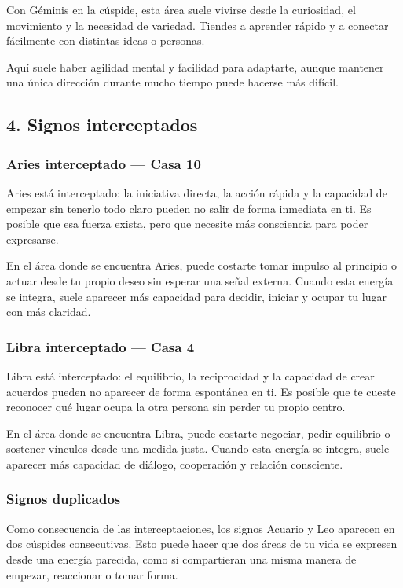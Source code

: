 \documentclass[11pt,a4paper]{article}
\begin{document}
Con Géminis en la cúspide, esta área suele vivirse desde la curiosidad, el movimiento y la necesidad de variedad. Tiendes a aprender rápido y a conectar fácilmente con distintas ideas o personas.

Aquí suele haber agilidad mental y facilidad para adaptarte, aunque mantener una única dirección durante mucho tiempo puede hacerse más difícil.



\vspace{0.5cm}

\subsection{4. Signos interceptados}

\subsubsection*{Aries interceptado — Casa 10}
Aries está interceptado: la iniciativa directa, la acción rápida y la capacidad de empezar sin tenerlo todo claro pueden no salir de forma inmediata en ti. Es posible que esa fuerza exista, pero que necesite más consciencia para poder expresarse.

En el área donde se encuentra Aries, puede costarte tomar impulso al principio o actuar desde tu propio deseo sin esperar una señal externa. Cuando esta energía se integra, suele aparecer más capacidad para decidir, iniciar y ocupar tu lugar con más claridad.

\subsubsection*{Libra interceptado — Casa 4}
Libra está interceptado: el equilibrio, la reciprocidad y la capacidad de crear acuerdos pueden no aparecer de forma espontánea en ti. Es posible que te cueste reconocer qué lugar ocupa la otra persona sin perder tu propio centro.

En el área donde se encuentra Libra, puede costarte negociar, pedir equilibrio o sostener vínculos desde una medida justa. Cuando esta energía se integra, suele aparecer más capacidad de diálogo, cooperación y relación consciente.

\subsubsection*{Signos duplicados}
Como consecuencia de las interceptaciones, los signos Acuario y Leo aparecen en dos cúspides consecutivas. Esto puede hacer que dos áreas de tu vida se expresen desde una energía parecida, como si compartieran una misma manera de empezar, reaccionar o tomar forma.
\end{document}
